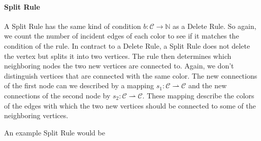 \documentclass{article}
\newcommand{\C}{\mathcal{C}}
\newcommand{\N}{\mathbb{N}}
\begin{document}
\paragraph*{Split Rule} A Split Rule has the same kind of condition $b : \C \to \N$ as a Delete Rule.
So again, we count the number of incident edges of each color to see if it matches the condition of the rule.
In contract to a Delete Rule, a Split Rule does not delete the vertex but splits it into two vertices.
The rule then determines which neighboring nodes the two new vertices are connected to.
Again, we don't distinguish vertices that are connected with the same color.
The new connections of the first node can we described by a mapping $s_1 : \C \rightharpoonup \C$ and the new connections of the second node by $s_2 : \C \rightharpoonup \C$.
These mapping describe the colors of the edges with which the two new vertices should be connected to some of the neighboring vertices.

An example Split Rule would be

\begin{center}
\end{center}
\end{document}
